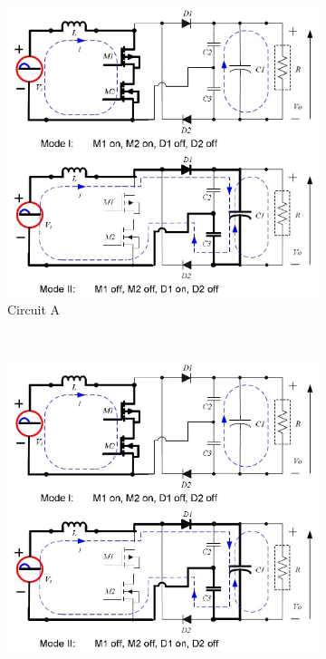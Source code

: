 \begin{figure}[h]
        \centering
        \begin{subfigure}[b]{0.3\textwidth}
                \includegraphics[width=\textwidth]{5}
                \caption{Circuit A}
                \label{fig:Circuit A}
        \end{subfigure}%
        ~ %
        \begin{subfigure}[b]{0.3\textwidth}
                \includegraphics[width=\textwidth]{5}

\end{subfigure}
\end{figure}
